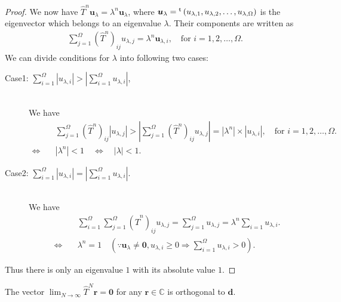 \begin{proof}
	We now have $\hat{T}^{n}\bm{u}_{\lambda}=\lambda^{n}\bm{u}_{\lambda}$, where $\bm{u}_{\lambda} = {}^{\rm t}\left(u_{\lambda,1}, u_{\lambda,2}, \dots, u_{\lambda,\Omega}\right)$ is the eigenvector which belongs to an eigenvalue $\lambda$. Their components are written as
	\begin{align}
	\sum_{j=1}^{\Omega}\left(\hat{T}^{n}\right)_{ij}u_{\lambda,j} = \lambda^{n} \bm{u}_{\lambda,i},\quad\text{for $i = 1,2,\dots,\Omega$}.
	\end{align}
	We can divide conditions for $\lambda$ into following two cases:
	\begin{description}
		\item[Case1: $\sum_{i=1}^{\Omega}|u_{\lambda,i}| > |\sum_{i=1}^{\Omega}u_{\lambda,i}|$,]\mbox{}\\
		We have
		\begin{align}
		&\sum_{j=1}^{\Omega}\left(\hat{T}^{n}\right)_{ij}|u_{\lambda,j}| > |\sum_{j=1}^{\Omega}\left(\hat{T}^{n}\right)_{ij}u_{\lambda,j}| = |\lambda^{n}|\times|u_{\lambda,i}|,\quad\text{for $i = 1,2,\dots,\Omega$}.\\
		\Longleftrightarrow\quad & |\lambda^{n}| < 1 \quad \Longleftrightarrow\quad |\lambda| < 1.
		\end{align}
		\item[Case2: $\sum_{i=1}^{\Omega}|u_{\lambda,i}| = |\sum_{i=1}^{\Omega}u_{\lambda,i}|$.]\mbox{}\\
		We have
		\begin{align}
		& \sum_{i=1}^{\Omega}\sum_{j=1}^{\Omega}\left(\hat{T}^{n}\right)_{ij}u_{\lambda,j}  = \sum_{j=1}^{\Omega}u_{\lambda,j}  = \lambda^{n}\sum_{i=1}u_{\lambda,i}.\\
		\Longleftrightarrow\quad & \lambda^{n} = 1\quad(\because \bm{u}_{\lambda}\neq\bm{0},u_{\lambda,i}\geq 0 \Rightarrow \sum_{i=1}^{\Omega}u_{\lambda,i} > 0).
		\end{align}
	\end{description}
	Thus there is only an eigenvalue $1$ with its absolute value $1$.
\end{proof}

\begin{theorem}
	The vector $\lim_{N\to\infty}\hat{T}^{N}\bm{r} = \bm{0}$ for any $\bm{r}\in\mathbb{C}$ is orthogonal to $\bm{d}$.
\end{theorem}

